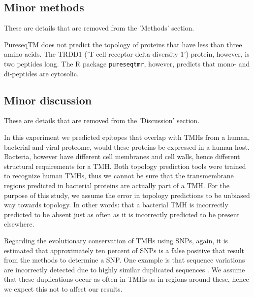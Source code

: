 \subsection{Minor methods}

These are details that are removed from the 'Methods' section.

PureseqTM does not predict the topology
of proteins that have less than three amino acids. 
The TRDD1 ('T cell receptor delta diversity 1') protein,
however, is two peptides long. 
The R package \verb;pureseqtmr;, however, 
predicts that mono- and di-peptides are cytosolic.

\subsection{Minor discussion}

These are details that are removed from the 'Discussion' section.


In this experiment we predicted epitopes that overlap with 
TMHs from a human, bacterial and viral proteome,
would these proteins be expressed in a human host.
Bacteria, however have different cell membranes and cell walls, 
hence different structural requirements for a TMH.
Both topology prediction tools were trained to recognize
human TMHs, thus we cannot be sure that
the transmembrane regions predicted in bacterial proteins
are actually part of a TMH.
For the purpose of this study, we assume the 
error in topology predictions to be unbiased way towards topology.
In other words: that a bacterial TMH is incorrectly
predicted to be absent just as often as it is incorrectly
predicted to be present elsewhere.


Regarding the evolutionary conservation of TMHs using SNPs,
again, it is estimated that approximately ten percent
of SNPs is a false positive that result from the methods to determine
a SNP. One example is that sequence variations are incorrectly
detected due to highly similar duplicated sequences \cite{musumeci2010single}.
We assume that these duplications occur as often in TMHs as in
regions around these, hence we expect this not to affect our results.

